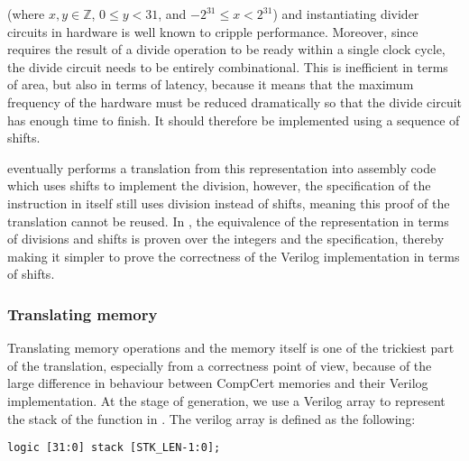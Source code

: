 (where $x, y \in \mathbb{Z}$, $0 \leq y < 31$, and $-2^{31} \leq x < 2^{31}$)
and instantiating divider circuits in hardware is well known to cripple
performance. Moreover, since \vericert{} requires the result of a divide
operation to be ready within a single clock cycle, the divide circuit needs to
be entirely combinational. This is inefficient in terms of area, but also in
terms of latency, because it means that the maximum frequency of the hardware
must be reduced dramatically so that the divide circuit has enough time to
finish.  It should therefore be implemented using a sequence of shifts.

\compcert{} eventually performs a translation from this representation into
assembly code which uses shifts to implement the division, however, the
specification of the instruction in \rtl{} itself still uses division instead of
shifts, meaning this proof of the translation cannot be reused.  In \vericert{},
the equivalence of the representation in terms of divisions and shifts is proven
over the integers and the specification, thereby making it simpler to prove the
correctness of the Verilog implementation in terms of shifts.

\subsubsection{Translating memory}
\label{sec:hg:translating-memory}

Translating memory operations and the memory itself is one of the trickiest part
of the translation, especially from a correctness point of view, because of the
large difference in behaviour between CompCert memories and their Verilog
implementation.  At the stage of \htl{} generation, we use a Verilog array to
represent the stack of the function in \rtlsubpar{}.  The verilog array is
defined as the following:

\begin{verbatim}
logic [31:0] stack [STK_LEN-1:0];
\end{verbatim}

